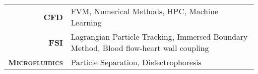 
\vspace{10pt}

\begin{tabular}{rl}
  \textsc{\textbf{CFD}}           & FVM, Numerical Methods, HPC, Machine Learning \\
  \textsc{\textbf{FSI}}           & Lagrangian Particle Tracking, Immersed Boundary Method, Blood flow-heart wall coupling \\
  \textsc{\textbf{Microfluidics}} & Particle Separation, Dielectrophoresis
\end{tabular}
